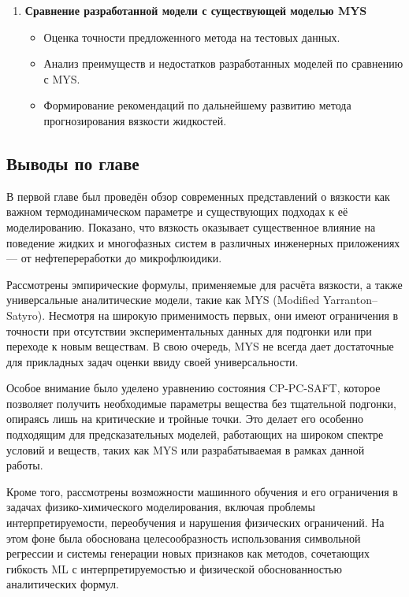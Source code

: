\documentclass[a4paper,12pt]{article}
\begin{document}
\begin{enumerate}
        \item \textbf{Сравнение разработанной модели с существующей моделью MYS}
        \begin{itemize}
            \item Оценка точности предложенного метода на тестовых данных.
            \item Анализ преимуществ и недостатков разработанных моделей по сравнению с MYS.
            \item Формирование рекомендаций по дальнейшему развитию метода прогнозирования вязкости жидкостей.
        \end{itemize}
    \end{enumerate}
  
  \subsection{Выводы по главе}
В первой главе был проведён обзор современных представлений о вязкости как важном термодинамическом параметре и существующих подходах к её моделированию. Показано, что вязкость оказывает существенное влияние на поведение жидких и многофазных систем в различных инженерных приложениях — от нефтепереработки до микрофлюидики.

Рассмотрены эмпирические формулы, применяемые для расчёта вязкости, а также универсальные аналитические модели, такие как MYS (Modified Yarranton–Satyro). Несмотря на широкую применимость первых, они имеют ограничения в точности при отсутствии экспериментальных данных для подгонки или при переходе к новым веществам. В свою очередь, MYS не всегда дает достаточные для прикладных задач оценки ввиду своей универсальности.  

Особое внимание было уделено уравнению состояния CP-PC-SAFT, которое позволяет получить необходимые параметры вещества без тщательной подгонки, опираясь лишь на критические и тройные точки. Это делает его особенно подходящим для предсказательных моделей, работающих на широком спектре условий и веществ, таких как MYS или разрабатываемая в рамках данной работы.

Кроме того, рассмотрены возможности машинного обучения и его ограничения в задачах физико-химического моделирования, включая проблемы интерпретируемости, переобучения и нарушения физических ограничений. На этом фоне была обоснована целесообразность использования символьной регрессии и системы генерации новых признаков как методов, сочетающих гибкость ML с интерпретируемостью и физической обоснованностью аналитических формул.
\end{document}

